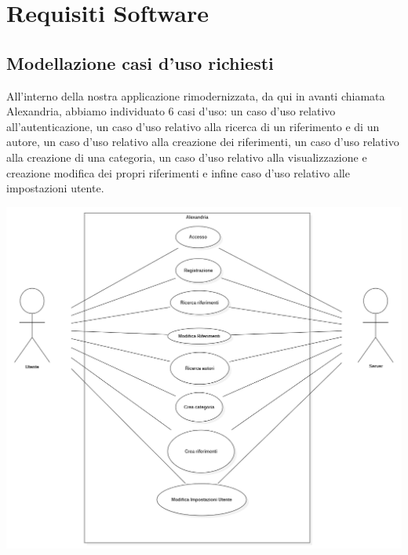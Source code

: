 \chapter{Requisiti Software}
\raggedright{\section{Modellazione casi d'uso richiesti}}
All'interno della nostra applicazione rimodernizzata, da qui in avanti chiamata \gls{Alexandria}, abbiamo individuato 6 \gls{casi d'uso}: un caso d'uso relativo all'autenticazione, un caso d'uso relativo alla ricerca di un \gls{riferimento} e di un \gls{autore}, un caso d'uso relativo alla creazione dei riferimenti, un caso d'uso relativo alla creazione di una \gls{categoria}, un caso d'uso relativo alla visualizzazione e creazione modifica dei propri riferimenti e infine caso d'uso relativo alle impostazioni utente.
         \begin{center}
     \hspace{-1cm}
            \includegraphics[width=.90\textwidth]{Immagini/Alexandria/useCase.png} 
        \end{center}
